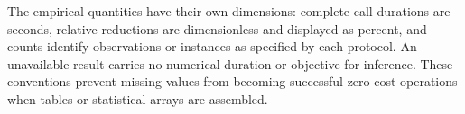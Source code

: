 The empirical quantities have their own dimensions: complete-call durations
are seconds, relative reductions are dimensionless and displayed as percent,
and counts identify observations or instances as specified by each protocol.
An unavailable result carries no numerical duration or objective for inference.
These conventions prevent missing values from becoming successful zero-cost
operations when tables or statistical arrays are assembled.
